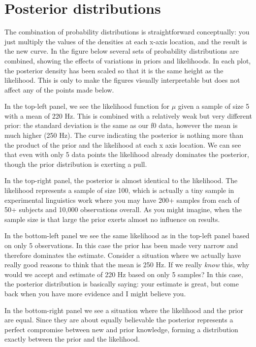 \documentclass[
]{book}
\begin{document}
\hypertarget{posterior-distributions}{%
\section{Posterior distributions}\label{posterior-distributions}}

The combination of probability distributions is straightforward conceptually: you just multiply the values of the densities at each x-axis location, and the result is the new curve. In the figure below several sets of probability distributions are combined, showing the effects of variations in priors and likelihoods. In each plot, the posterior density has been scaled so that it is the same height as the likelihood. This is only to make the figures visually interpretable but does not affect any of the points made below.

In the top-left panel, we see the likelihood function for \(\mu\) given a sample of size 5 with a mean of 220 Hz. This is combined with a relatively weak but very different prior: the standard deviation is the same as our f0 data, however the mean is much higher (250 Hz). The curve indicating the posterior is nothing more than the product of the prior and the likelihood at each x axis location. We can see that even with only 5 data points the likelihood already dominates the posterior, though the prior distribution is exerting a pull.

In the top-right panel, the posterior is almost identical to the likelihood. The likelihood represents a sample of size 100, which is actually a tiny sample in experimental linguistics work where you may have 200+ samples from each of 50+ subjects and 10,000 observations overall. As you might imagine, when the sample size is that large the prior exerts almost no influence on results.

In the bottom-left panel we see the same likelihood as in the top-left panel based on only 5 observations. In this case the prior has been made very narrow and therefore dominates the estimate. Consider a situation where we actually have really good reasons to think that the mean is 250 Hz. If we really \emph{know} this, why would we accept and estimate of 220 Hz based on only 5 samples? In this case, the posterior distribution is basically saying: your estimate is great, but come back when you have more evidence and I might believe you.

In the bottom-right panel we see a situation where the likelihood and the prior are equal. Since they are about equally believable the posterior represents a perfect compromise between new and prior knowledge, forming a distribution exactly between the prior and the likelihood.
\end{document}
